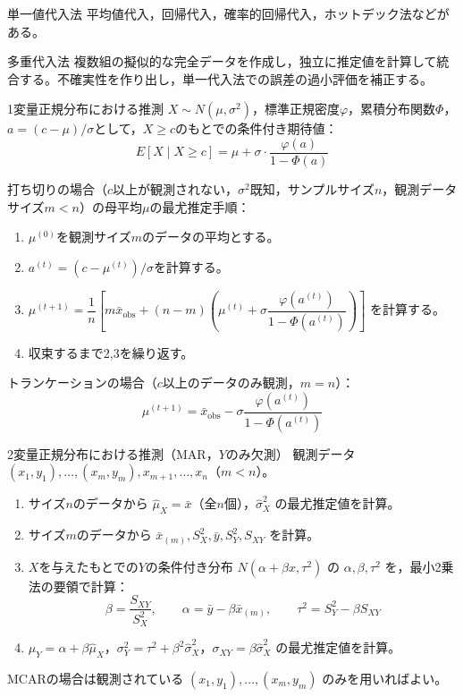 \documentclass[a4paper,11pt]{ltjsarticle}
\begin{document}
\begin{term}{単一値代入法}
平均値代入，回帰代入，確率的回帰代入，ホットデック法などがある。
\end{term}

\begin{term}{多重代入法}
複数組の擬似的な完全データを作成し，独立に推定値を計算して統合する。不確実性を作り出し，単一代入法での誤差の過小評価を補正する。
\end{term}

\begin{term}{1変量正規分布における推測}
$X\sim N(\mu,\sigma^2)$，標準正規密度$\varphi$，累積分布関数$\Phi$，$a=(c-\mu)/\sigma$として，$X\ge c$のもとでの条件付き期待値：
\[
E[X\mid X\ge c] = \mu+\sigma\cdot\frac{\varphi(a)}{1-\Phi(a)}
\]
\end{term}

打ち切りの場合（$c$以上が観測されない，$\sigma^2$既知，サンプルサイズ$n$，観測データサイズ$m<n$）の母平均$\mu$の最尤推定手順：
\begin{enumerate}[label=\arabic*.]
\item $\mu^{(0)}$を観測サイズ$m$のデータの平均とする。
\item $a^{(t)}=(c-\mu^{(t)})/\sigma$を計算する。
\item $\mu^{(t+1)} = \dfrac{1}{n}\left[m\bar x_{\text{obs}} + (n-m)\left(\mu^{(t)}+\sigma\dfrac{\varphi(a^{(t)})}{1-\Phi(a^{(t)})}\right)\right]$ を計算する。
\item 収束するまで2,3を繰り返す。
\end{enumerate}
トランケーションの場合（$c$以上のデータのみ観測，$m=n$）：
\[
\mu^{(t+1)} = \bar x_{\text{obs}} - \sigma\frac{\varphi(a^{(t)})}{1-\Phi(a^{(t)})}
\]

\begin{term}{2変量正規分布における推測（MAR，$Y$のみ欠測）}
観測データ $(x_1,y_1),\dots,(x_m,y_m),x_{m+1},\dots,x_n$（$m<n$）。
\begin{enumerate}[label=\arabic*.]
\item サイズ$n$のデータから $\hat\mu_X=\bar x$（全$n$個），$\hat\sigma_X^2$ の最尤推定値を計算。
\item サイズ$m$のデータから $\bar x_{(m)},S_X^2,\bar y,S_Y^2,S_{XY}$ を計算。
\item $X$を与えたもとでの$Y$の条件付き分布 $N(\alpha+\beta x,\tau^2)$ の $\alpha,\beta,\tau^2$ を，最小2乗法の要領で計算：
\[
\beta = \frac{S_{XY}}{S_X^2},\qquad \alpha = \bar y-\beta\bar x_{(m)},\qquad \tau^2 = S_Y^2-\beta S_{XY}
\]
\item $\mu_Y=\alpha+\beta\hat\mu_X$，$\sigma_Y^2=\tau^2+\beta^2\hat\sigma_X^2$，$\sigma_{XY}=\beta\hat\sigma_X^2$ の最尤推定値を計算。
\end{enumerate}
MCARの場合は観測されている $(x_1,y_1),\dots,(x_m,y_m)$ のみを用いればよい。
\end{term}
\end{document}
